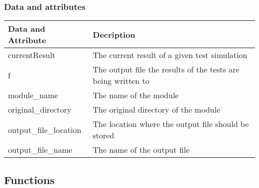 \documentclass{asme2ej}
\begin{document}
\subsubsection{Data and attributes}
\begin{longtable}{ p{}  p{} }
\hline
Data and Attribute & Decription\\
\hline
\hline
currentResult & The current result of a given test simulation\\
f & The output file the results of the tests are being written to\\
module\_name & The name of the module\\
original\_directory & The original directory of the module\\
output\_file\_location & The location where the output file should be stored\\
output\_file\_name & The name of the output file\\
\hline
\end{longtable}
\subsection{Functions}
\end{document}
